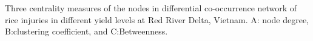 Three centrality measures of the nodes in differential co-occurrence network of rice injuries in different yield levels at Red River Delta, Vietnam. A: node degree, B:clustering coefficient, and C:Betweenness.
\label{fig:nodepropdifyieldRR}